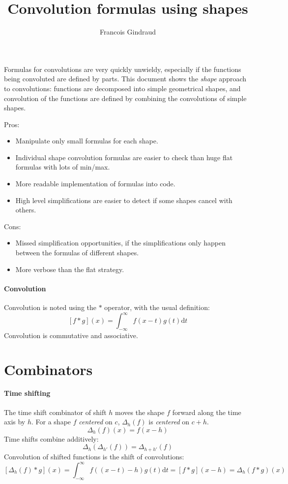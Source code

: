 \documentclass[a4paper,10pt]{article}
\title{Convolution formulas using shapes}
\author{Francois Gindraud}
\date{}
\newcommand\Shifted[2]{\Delta_{#1}(#2)}
\newcommand\D{\mathrm{d}}
\newcommand\Convolution{\ast}
\newcommand\IntR[2]{\int_{-\infty}^{\infty}#1 \D#2}
\begin{document}
\maketitle

Formulas for convolutions are very quickly unwieldy, especially if the functions being convoluted are defined by parts.
This document shows the \emph{shape} approach to convolutions: functions are decomposed into simple geometrical shapes, and convolution of the functions are defined by combining the convolutions of simple shapes.

Pros:
\begin{itemize}
    \item Manipulate only small formulas for each shape.
    \item Individual shape convolution formulas are easier to check than huge flat formulas with lots of min/max.
    \item More readable implementation of formulas into code.
    \item High level simplifications are easier to detect if some shapes cancel with others.
\end{itemize}
Cons:
\begin{itemize}
    \item Missed simplification opportunities, if the simplifications only happen between the formulas of different shapes.
    \item More verbose than the flat strategy.
\end{itemize}

\paragraph{Convolution}
Convolution is noted using the $\Convolution$ operator, with the usual definition:
\[ \left[ f \Convolution g \right](x) = \IntR{f(x - t) g(t)}{t} \]
Convolution is commutative and associative.

\section{Combinators}

\paragraph{Time shifting}
The time shift combinator of shift $h$ moves the shape $f$ forward along the time axis by $h$.
For a shape $f$ \emph{centered} on $c$, $\Shifted{h}{f}$ is \emph{centered} on $c+h$.
\[ \Shifted{h}{f}(x) = f(x - h) \]
Time shifts combine additively:
\[ \Shifted{h}{\Shifted{h'}{f}}= \Shifted{h+h'}{f} \]
Convolution of shifted functions is the shift of convolutions:
\[
    \left[ \Shifted{h}{f} \Convolution g \right](x) =
    \IntR{ f((x - t) - h) g(t) }{t} =
    \left[ f \Convolution g \right](x-h) =
    \Shifted{h}{f \Convolution g}(x)
\]
\end{document}
